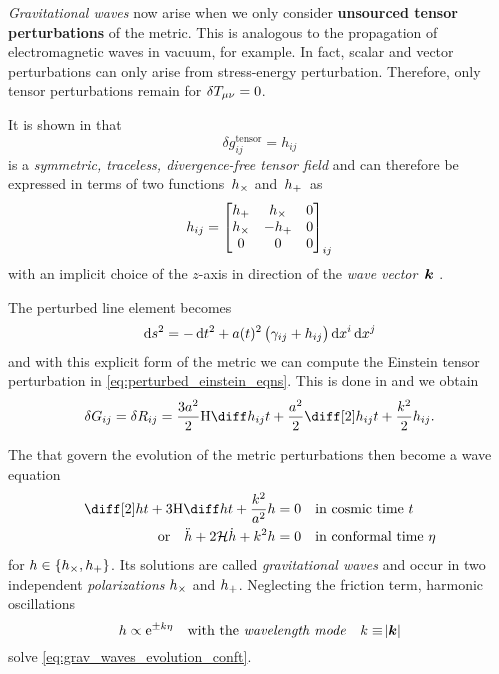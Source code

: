 \documentclass[12pt,parskip=half]{scrreprt}
\newcommand{\addref}{\todo[color=black!20]{ref.}}
\begin{document}
\emph{Gravitational waves} now arise when we only consider \textbf{unsourced tensor perturbations} of the metric. This is analogous to the propagation of electromagnetic waves in vacuum, for example.  In fact, scalar and vector perturbations can only arise from stress-energy perturbation. \addref Therefore, only tensor perturbations remain for \(\delta T_{\mu \nu}=0\).

It is shown in  that
\begin{equation}
	\delta g^{\mathrm{tensor}}_{ij} = h_{ij}
\end{equation}
is a \emph{symmetric, traceless, divergence-free tensor field} and can therefore be expressed in terms of two functions~\(h_\times\) and~\(h_+\)~as
\begin{equation}
	h_{ij} =
	\begin{bmatrix}
		h_+ & h_\times & 0 \\
		h_\times & -h_+ & 0 \\
		0 & 0 & 0
	\end{bmatrix}_{ij}
\end{equation}
with an implicit choice of the \(z\)-axis in direction of the \emph{wave vector}~\(\boldsymbol{k}\) \citep{Dodelson}. 

The perturbed line element becomes
\begin{equation}
	\dif{s}^2 = -\dif{t}^2 + a(t)^2 \del{\gamma_{ij} + h_{ij}} \dif{x^i}\dif{x^j}
\end{equation}
and with this explicit form of the metric we can compute the Einstein tensor perturbation in \eqref{eq:perturbed_einstein_eqns}. This is done in  and we obtain
\begin{align}\label{eq:evolution}
	\delta\Gtens_{ij} = \delta\Rtens_{ij} = \frac{3 a^2}{2} \Hcosm \dt{h_{ij}} + \frac{a^2}{2}\ddt{h_{ij}} + \frac{k^2}{2}h_{ij} \eqpunct{.}
\end{align}

The  that govern the evolution of the metric perturbations then become a wave equation 
\begin{subequations}\label{eq:grav_waves_evolution}
\begin{align}
	\ddt{h} + 3 \Hcosm \dt{h} + \frac{k^2}{a^2} h &= 0 \quad \text{in cosmic time \(t\)} \\
	\text{or} \quad \ddconf{h} + 2 \Hconf \dconf{h} + k^2 h &= 0 \quad \text{in conformal time \(\conft\)} \label{eq:grav_waves_evolution_conft}
\end{align}
\end{subequations}
for \(h \in \cbr{\hcross, \hplus}\). Its solutions are called \emph{gravitational waves} and occur in two independent \emph{polarizations} \(h_\times\) and \(h_+\). Neglecting the friction term, harmonic oscillations
\begin{equation}
	h \propto \mathrm{e}^{\pm k \eta} \quad \text{with the \emph{wavelength mode}} \quad k \equiv \abs{\boldsymbol{k}}
\end{equation}
solve \eqref{eq:grav_waves_evolution_conft}.
\end{document}

